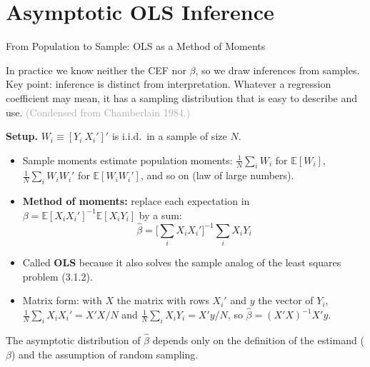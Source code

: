 \documentclass[aspectratio=169,11pt]{beamer}
\newcommand{\E}{\mathbb{E}}
\newcommand{\Src}[1]{{\scriptsize\textcolor{DarkGray}{#1}}}
\begin{document}

\section{Asymptotic OLS Inference}

\begin{frame}{From Population to Sample: OLS as a Method of Moments}
\small

In practice we know neither the CEF nor $\beta$, so we draw inferences from
samples. Key point: \alert{inference is distinct from interpretation}.
Whatever a regression coefficient may mean, it has a sampling distribution
that is easy to describe and use. \Src{(Condensed from Chamberlain 1984.)}

\medskip

\textbf{Setup.} $W_i\equiv[Y_i\ X_i']'$ is i.i.d.\ in a sample of size $N$.
\begin{itemize}
    \item Sample moments estimate population moments:
    $\frac1N\sum_i W_i$ for $\E[W_i]$, $\frac1N\sum_i W_iW_i'$ for
    $\E[W_iW_i']$, and so on (law of large numbers).
    \item \textbf{Method of moments:} replace each expectation in
    $\beta=\E[X_iX_i']^{-1}\E[X_iY_i]$ by a sum:
    \[
    \boxed{
    \hat\beta = \Big[\sum_i X_iX_i'\Big]^{-1}\sum_i X_iY_i
    }
    \]
    \item Called \textbf{OLS} because it also solves the sample analog of
    the least squares problem (3.1.2).
    \item Matrix form: with $X$ the matrix with rows $X_i'$ and $y$ the vector
    of $Y_i$, $\frac1N\sum_iX_iX_i'=X'X/N$ and $\frac1N\sum_iX_iY_i=X'y/N$, so
    $\hat\beta=(X'X)^{-1}X'y$.
\end{itemize}

\medskip

The asymptotic distribution of $\hat\beta$ depends only on the definition of
the estimand ($\beta$) and the assumption of random sampling.

\end{frame}
\end{document}
